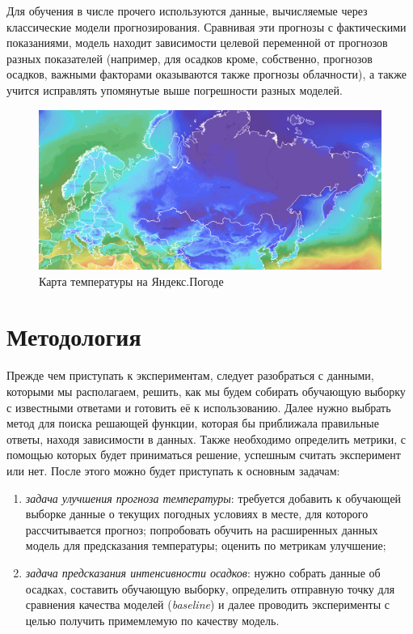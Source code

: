 \documentclass[14pt]{matmex-diploma}
\begin{document}
Для обучения в числе прочего используются данные, вычисляемые через классические модели прогнозирования. Сравнивая эти прогнозы с фактическими показаниями, модель находит зависимости целевой переменной от прогнозов разных показателей (например, для осадков кроме, собственно, прогнозов осадков, важными факторами оказываются также прогнозы облачности), а также учится исправлять упомянутые выше погрешности разных моделей.



\begin{figure}
\centering
\includegraphics[width=\linewidth]{images/map_coursework.png}
\caption{Карта температуры на Яндекс.Погоде}
\label{fig:map}
\end{figure}



\section{Методология}
Прежде чем приступать к экспериментам, следует разобраться с данными, которыми мы располагаем, решить, как мы будем собирать обучающую выборку с известными ответами и готовить её к использованию. Далее нужно выбрать метод для поиска решающей функции, которая бы приближала правильные ответы, находя зависимости в данных. Также необходимо определить метрики, с помощью которых будет приниматься решение, успешным считать эксперимент или нет. После этого можно будет приступать к основным задачам: 

\begin{enumerate}
    \item \textit{задача улучшения прогноза температуры}: требуется добавить к обучающей выборке данные о текущих погодных условиях в месте, для которого рассчитывается прогноз; попробовать обучить на расширенных данных модель для предсказания температуры; оценить по метрикам улучшение;
    \item \textit{задача предсказания интенсивности осадков}: нужно собрать данные об осадках, составить обучающую выборку, определить отправную точку для сравнения качества моделей (\textit{baseline}) и далее проводить эксперименты с целью получить примемлемую по качеству модель.
\end{enumerate}
\end{document}
